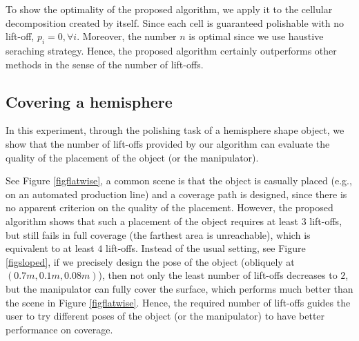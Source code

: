 \documentclass[journal]{IEEEtran}
\begin{document}
To show the optimality of the proposed algorithm, we apply it to the cellular decomposition created by itself. Since each cell is guaranteed polishable with no lift-off, $p_i = 0, \forall i$. Moreover, the number $n$ is optimal since we use haustive seraching strategy. Hence, the proposed algorithm certainly outperforms other methods in the sense of the number of lift-offs. 



\subsection{Covering a hemisphere}
In this experiment, through the polishing task of a hemisphere shape object, we show that the number of lift-offs provided by our algorithm can evaluate the quality of the placement of the object (or the manipulator). 

See Figure \ref{figflatwise}, a common scene is that the object is casually placed (e.g., on an automated production line) and a coverage path is designed, since there is no apparent criterion on the quality of the placement. However, the proposed algorithm shows that such a placement of the object requires at least $3$ lift-offs, but still fails in full coverage (the farthest area is unreachable), which is equivalent to at least $4$ lift-offs. 
Instead of the usual setting, see Figure \ref{figsloped}, if we precisely design the pose of the object (obliquely at $(0.7m, 0.1m, 0.08m)$), then not only the least number of lift-offs decreases to $2$, but the manipulator can fully cover the surface, which performs much better than the scene in Figure \ref{figflatwise}. Hence, the required number of lift-offs guides the user to try different poses of the object (or the manipulator) to have better performance on coverage. 
\end{document}
